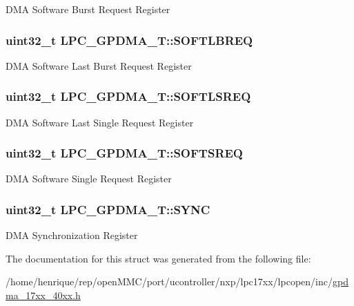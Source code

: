 D\-M\-A Software Burst Request Register \hypertarget{structLPC__GPDMA__T_a565d4d2985feee1cf21acee1185373a5}{
\subsubsection[{S\-O\-F\-T\-L\-B\-R\-E\-Q}]{ uint32\-\_\-t L\-P\-C\-\_\-\-G\-P\-D\-M\-A\-\_\-\-T\-::\-S\-O\-F\-T\-L\-B\-R\-E\-Q}}\label{structLPC__GPDMA__T_a565d4d2985feee1cf21acee1185373a5}
D\-M\-A Software Last Burst Request Register \hypertarget{structLPC__GPDMA__T_a0b7a85e9f40e19d368c8358ca48778de}{
\subsubsection[{S\-O\-F\-T\-L\-S\-R\-E\-Q}]{ uint32\-\_\-t L\-P\-C\-\_\-\-G\-P\-D\-M\-A\-\_\-\-T\-::\-S\-O\-F\-T\-L\-S\-R\-E\-Q}}\label{structLPC__GPDMA__T_a0b7a85e9f40e19d368c8358ca48778de}
D\-M\-A Software Last Single Request Register \hypertarget{structLPC__GPDMA__T_a2905a8988cfd38c6e44d121783c0bfe7}{
\subsubsection[{S\-O\-F\-T\-S\-R\-E\-Q}]{ uint32\-\_\-t L\-P\-C\-\_\-\-G\-P\-D\-M\-A\-\_\-\-T\-::\-S\-O\-F\-T\-S\-R\-E\-Q}}\label{structLPC__GPDMA__T_a2905a8988cfd38c6e44d121783c0bfe7}
D\-M\-A Software Single Request Register \hypertarget{structLPC__GPDMA__T_ac89c20888b14781ead9fe459f8f79853}{
\subsubsection[{S\-Y\-N\-C}]{ uint32\-\_\-t L\-P\-C\-\_\-\-G\-P\-D\-M\-A\-\_\-\-T\-::\-S\-Y\-N\-C}}\label{structLPC__GPDMA__T_ac89c20888b14781ead9fe459f8f79853}
D\-M\-A Synchronization Register 

The documentation for this struct was generated from the following file\-:\begin{DoxyCompactItemize}
\item 
/home/henrique/rep/open\-M\-M\-C/port/ucontroller/nxp/lpc17xx/lpcopen/inc/\hyperlink{gpdma__17xx__40xx_8h}{gpdma\-\_\-17xx\-\_\-40xx.\-h}\end{DoxyCompactItemize}
